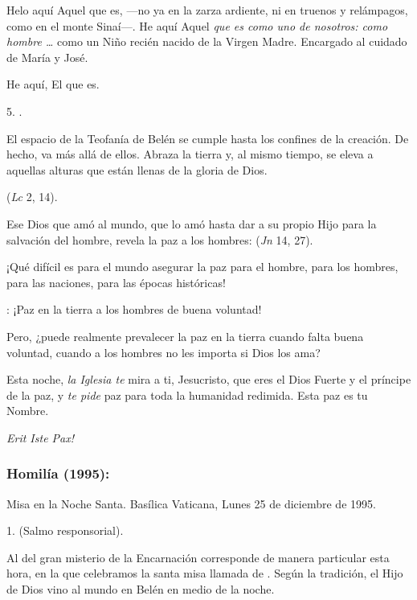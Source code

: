 \begin{body}
\begin{body}
		Helo aquí Aquel que es, ---no ya en la zarza ardiente, ni en truenos y relámpagos, como en el monte Sinaí---. He aquí Aquel \emph{que es como uno de nosotros: como hombre \ldots{}} como un Niño recién nacido de la Virgen Madre. Encargado al cuidado de María y José.

		He aquí, El que es.

		5. .

		El espacio de la Teofanía de Belén se cumple hasta los confines de la creación. De hecho, va más allá de ellos. Abraza la tierra y, al mismo tiempo, se eleva a aquellas alturas que están llenas de la gloria de Dios.

		 (\emph{Lc} 2, 14).

		Ese Dios que amó al mundo, que lo amó hasta dar a su propio Hijo para la salvación del hombre, revela la paz a los hombres:  (\emph{Jn} 14, 27).

		¡Qué difícil es para el mundo asegurar la paz para el hombre, para los hombres, para las naciones, para las épocas históricas!

		: ¡Paz en la tierra a los hombres de buena voluntad!

		Pero, ¿puede realmente prevalecer la paz en la tierra cuando falta buena voluntad, cuando a los hombres no les importa si Dios los ama?

		Esta noche, \emph{la Iglesia te} mira a ti, Jesucristo, que eres el Dios Fuerte y el príncipe de la paz, y \emph{te pide} paz para toda la humanidad redimida. Esta paz es tu Nombre.

		\emph{Erit Iste Pax!}
	\end{body}

	\subsubsection{Homilía (1995):} Misa en la Noche Santa. Basílica Vaticana, Lunes 25 de diciembre de 1995.

	\begin{body}
		1.  (Salmo responsorial).

		Al  del gran misterio de la Encarnación corresponde de manera particular esta hora, en la que celebramos la santa misa llamada de . Según la tradición, el Hijo de Dios vino al mundo en Belén en medio de la noche.


\end{body}
\end{body}
